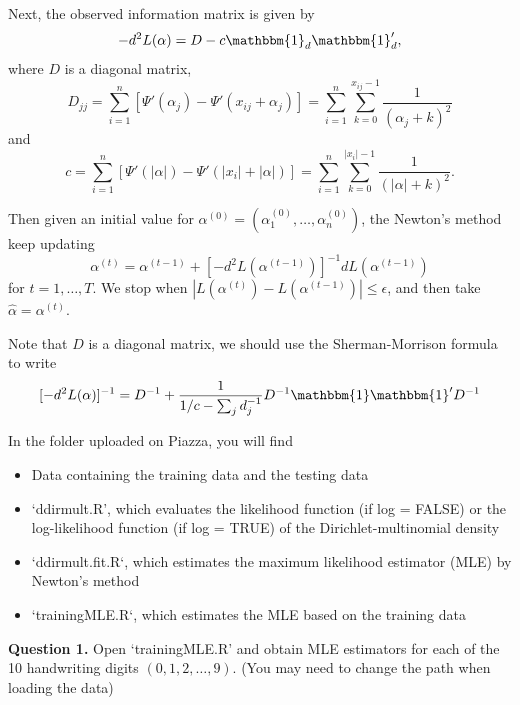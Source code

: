\documentclass[twoside, letter]{article}
\begin{document}
Next, the observed information matrix is given by
$$
- d^2 L(\alpha) = D - c\mathbbm{1}_d \mathbbm{1}_d',
$$
where $D$ is a diagonal matrix,
$$
D_{jj} = \sum_{i=1}^n \left[\Psi'(\alpha_j) - \Psi'(x_{ij} + \alpha_j) \right]
=
\sum_{i=1}^n \sum_{k=0}^{x_{ij} - 1} \frac{1}{(\alpha_j + k)^2}
$$
and 
$$
c = \sum_{i=1}^n 
\left[
\Psi'(|\alpha|)  - \Psi'(|x_i| + |\alpha|) 
\right]
= \sum_{i=1}^n \sum_{k=0}^{|x_i| - 1} \frac{1}{(|\alpha| + k)^2}.
$$

Then given an initial value for $\alpha^{(0)}  = (\alpha_1^{(0)}, \dots, \alpha_n^{(0)})$, the Newton's method keep updating 
$$
\alpha^{(t)} = \alpha^{(t-1)} + [-d^2 L(\alpha^{(t-1)})]^{-1} d L(\alpha^{(t-1)})
$$
for $t = 1, \dots, T$. We stop when $|L(\alpha^{(t)}) - L(\alpha^{(t-1)})| \leq \epsilon$, and then take $\hat\alpha = \alpha^{(t)}$.

Note that $D$ is a diagonal matrix, we should use the Sherman-Morrison formula to write 
$$
[- d^2 L(\alpha)]^{-1} = D^{-1} + \frac{1}{1/c - \sum_j d_j^{-1}} D^{-1} \mathbbm{1} \mathbbm{1}' D^{-1}
$$


In the folder uploaded on Piazza, you will find 
\begin{itemize}
\item Data containing the training data and the testing data
\item `ddirmult.R', which evaluates the likelihood function (if log = FALSE) or the log-likelihood function (if log = TRUE) of the Dirichlet-multinomial density
\item `ddirmult.fit.R`, which estimates the maximum likelihood estimator (MLE) by Newton's method
\item `trainingMLE.R`, which estimates the MLE based on the training data
\end{itemize}

{\bf Question 1.} Open `trainingMLE.R' and obtain MLE estimators for each of the 10 handwriting digits $(0,1,2,\dots,9)$. (You may need to change the path when loading the data)
\end{document}
